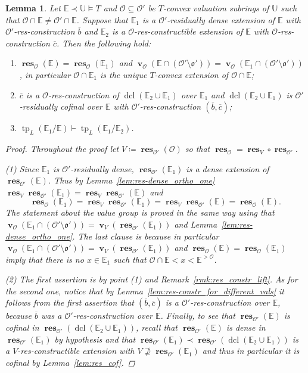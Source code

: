 \documentclass{amsart}
\newtheorem{lemma}[theorem]{Lemma}
\theoremstyle{remark}
\theoremstyle{definition}
\theoremstyle{plain}
\newcommand{\bE}{\mathbb E}
\newcommand{\bU}{\mathbb U}
\newcommand{\cO}{\mathcal O}
\newcommand{\co}{\mathfrak o}
\DeclareMathOperator{\val}{\mathbf{v}}
\DeclareMathOperator{\res}{\mathbf{res}}
\DeclareMathOperator{\tp}{\mathrm{tp}}
\DeclareMathOperator{\dcl}{\mathrm{dcl}}
\theoremstyle{plain}
\begin{document}
\begin{lemma}\label{lem:res-dense_ortho}
    Let $\bE \prec \bU \models T$ and $\cO \subseteq \cO'$ be $T$-convex valuation subrings of $\bU$ such that $\cO \cap \bE \neq \cO' \cap \bE$. Suppose that $\bE_1$ is a $\cO'$-residually dense extension of $\bE$ with $\cO'$-res-construction $\overline{b}$ and $\bE_2$ is a $\cO$-res-constructible extension of $\bE$ with $\cO$-res-construction $\overline{c}$. Then the following hold:
    \begin{enumerate}
        \item $\res_{\cO}(\bE)=\res_\cO(\bE_1)$ and $\val_{\cO}(\bE \cap (\cO'\setminus \co'))= \val_\cO (\bE_1 \cap (\cO'\setminus \co'))$, in particular $\cO \cap \bE_1$ is the unique $T$-convex extension of $\cO \cap \bE$; 
        \item $\overline{c}$ is a $\cO$-res-construction of $\dcl(\bE_2\cup \bE_1)$ over $\bE_1$ and $\dcl(\bE_2\cup \bE_1)$ is $\cO'$-residually cofinal over $\bE$ with $\cO'$-res-construction $(\overline{b}, \overline{c})$;
        \item $\tp_L(\bE_1/\bE) \vdash \tp_L(\bE_1/\bE_2)$.
    \end{enumerate}
    \begin{proof}
        Throughout the proof let $V\coloneqq \res_{\cO'}(\cO)$ so that $\res_\cO= \res_V \circ \res_{\cO'}$.
        
        (1) Since $\bE_1$ is $\cO'$-residually dense, $\res_{\cO'}(\bE_1)$ is a dense extension of $\res_{\cO'}(\bE)$. Thus by Lemma~\ref{lem:res-dense_ortho_one} $\res_V \res_{\cO'}(\bE_1) = \res_V \res_{\cO'}(\bE)$ and
        \[\res_{\cO}(\bE_1)=\res_V \res_{\cO'}(\bE_1) = \res_V \res_{\cO'}(\bE) = \res_{\cO}(\bE).\]
        The statement about the value group is proved in the same way using that $\val_\cO(\bE_1 \cap (\cO' \setminus \co'))=\val_{V}(\res_{\cO'}(\bE_1))$ and Lemma~\ref{lem:res-dense_ortho_one}. The last clause is because in particular $\val_\cO(\bE_1 \cap (\cO' \setminus \co'))=\val_{V}(\res_{\cO'}(\bE_1))$ and $\res_{\cO}(\bE)=\res_\cO(\bE_1)$ imply that there is no $x \in \bE_1$ such that $\cO \cap \bE < x <\bE^{>\cO}$.
        
        (2) The first assertion is by point (1) and Remark~\ref{rmk:res_constr_lift}. As for the second one, notice that by Lemma~\ref{lem:res-constr_for_different_vals} it follows from the first assertion that $(\overline{b}, \overline{c})$ is a $\cO'$-res-construction over $\bE$, because $\overline{b}$ was a $\cO'$-res-construction over $\bE$. Finally, to see that $\res_{\cO'}(\bE)$ is cofinal in $\res_{\cO'}(\dcl(\bE_2 \cup \bE_1))$, recall that $\res_{\cO'}(\bE)$ is dense in $\res_{\cO'}(\bE_1)$ by hypothesis and that $\res_{\cO'}(\bE_1) \prec \res_{\cO'}(\dcl(\bE_2 \cup \bE_1))$ is a $V$-res-constructible extension with $V \not \supseteq \res_{\cO'}(\bE_1)$ and thus in particular it is cofinal by Lemma~\ref{lem:res_cof}.


\end{proof}
\end{lemma}
\end{document}
